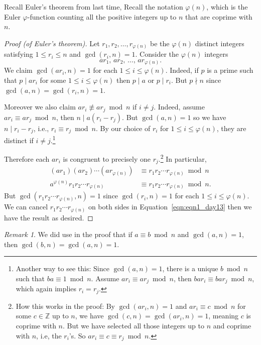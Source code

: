 \documentclass{amsbook}
\theoremstyle{plain}
\theoremstyle{definition}
\theoremstyle{remark}
\newtheorem{remark}[theorem]{Remark}
\numberwithin{equation}{chapter}
\numberwithin{figure}{chapter}
\newcommand{\Z}{\mathbb{Z}}
\begin{document}
Recall Euler's theorem from last time,
\eulerthm*
Recall the notation $\varphi (n) $, which is the Euler $\varphi$-function counting all the positive integers up to $n$ that are coprime with $n$.
\begin{proof}[Proof {\rm (of Euler's theorem)}]
  Let $r_1, r_2, \ldots, r_{\varphi(n)}$ be the $\varphi (n)$ distinct integers satisfying $1 \leqslant r_i \leqslant n$ and $\gcd(r_i, n) = 1$. Consider the $\varphi (n)$ integers
\[
ar_1, \, ar_2, \, \ldots, \, ar_{\varphi(n)}.
\]
We claim $\gcd (ar_i, n) = 1$ for each $1 \leqslant i \leqslant \varphi(n)$. Indeed, if $p$ is a prime such that $p \mid ar_i$ for some $1 \leqslant i \leqslant \varphi(n)$ then $p \mid a$ or $p \mid r_i $. But $p \nmid n$ since $\gcd (a, n) = \gcd(r_i, n) = 1$.

Moreover we also claim $ar_i \not\equiv ar_j \bmod n$ if $i \neq j$. Indeed, assume $ar_i \equiv ar_j \bmod n$, then $n \mid a(r_i - r_j)$. But $\gcd (a, n) = 1$ so we have $n \mid r_i - r_j$, i.e., $r_i \equiv r_j \bmod n$. By our choice of $r_i$ for $1 \leqslant i \leqslant \varphi(n)$, they are distinct if $i \neq j$.\footnote{Another way to see this: Since $\gcd (a, n) = 1$, there is a unique $b \bmod n$ such that $ba \equiv 1 \bmod n$. Assume $ar_i \equiv ar_j \bmod n$, then $ba r_i \equiv ba r_j \bmod n$, which again implies $r_i = r_j$.} 

Therefore each $ar_i$ is congruent to precisely one $r_j$.\footnote{How this works in the proof: By $\gcd (ar_i,n) = 1$ and $ar_i \equiv c \bmod n$ for some $c \in \Z$ up to $n$, we have $\gcd (c, n) = \gcd (ar_i, n) = 1$, meaning $c$ is coprime with $n$. But we have selected all those integers up to $n$ and coprime with $n$, i.e, the $r_i$'s. So $ar_i \equiv c \equiv r_j \bmod n$.} In particular,
\begin{align}
  (ar_1)(ar_2) \cdots (ar_{\varphi(n)}) &\equiv r_1 r_2 \cdots r_{\varphi(n)} \bmod n \\
\label{eqn:eqn1_day13}  a^{\varphi(n)} r_1 r_2 \cdots r_{\varphi(n)} &\equiv r_1 r_2 \cdots r_{\varphi(n)} \bmod n .
\end{align}
But $\gcd (r_1 r_2 \cdots r_{\varphi(n)}, n) = 1$ since $\gcd (r_i, n) = 1$ for each $1 \leqslant i \leqslant \varphi(n)$. We can cancel $r_1 r_2 \cdots r_{\varphi(n)}$ on both sides in Equation~\eqref{eqn:eqn1_day13} then we have the result as desired.
\end{proof}
\begin{remark}
  We did use in the proof that if $a \equiv b \bmod n$ and $\gcd (a, n) = 1$, then $\gcd (b, n) = \gcd (a, n) = 1$.
\end{remark}
\end{document}

